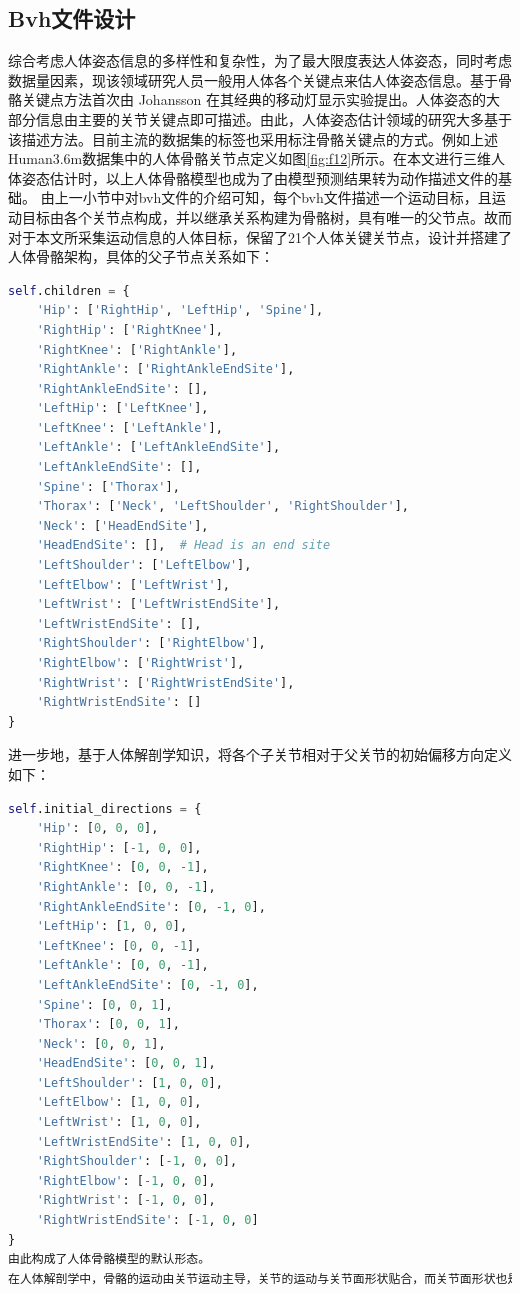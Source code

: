 \subsection{Bvh文件设计}{}
综合考虑人体姿态信息的多样性和复杂性，为了最大限度表达人体姿态，同时考虑数据量因素，现该领域研究人员一般用人体各个关键点来估人体姿态信息。基于骨骼关键点方法首次由  Johansson 在其经典的移动灯显示实验提出。人体姿态的大部分信息由主要的关节关键点即可描述。由此，人体姿态估计领域的研究大多基于该描述方法。目前主流的数据集的标签也采用标注骨骼关键点的方式。例如上述Human3.6m数据集中的人体骨骼关节点定义如图\ref{fig:f12}所示。在本文进行三维人体姿态估计时，以上人体骨骼模型也成为了由模型预测结果转为动作描述文件的基础。
由上一小节中对bvh文件的介绍可知，每个bvh文件描述一个运动目标，且运动目标由各个关节点构成，并以继承关系构建为骨骼树，具有唯一的父节点。故而对于本文所采集运动信息的人体目标，保留了21个人体关键关节点，设计并搭建了人体骨骼架构，具体的父子节点关系如下：

\begin{lstlisting}[language=python, label={lst:children}]
 self.children = {
    'Hip': ['RightHip', 'LeftHip', 'Spine'],
    'RightHip': ['RightKnee'],
    'RightKnee': ['RightAnkle'],
    'RightAnkle': ['RightAnkleEndSite'],
    'RightAnkleEndSite': [],
    'LeftHip': ['LeftKnee'],
    'LeftKnee': ['LeftAnkle'],
    'LeftAnkle': ['LeftAnkleEndSite'],
    'LeftAnkleEndSite': [],
    'Spine': ['Thorax'],
    'Thorax': ['Neck', 'LeftShoulder', 'RightShoulder'],
    'Neck': ['HeadEndSite'],
    'HeadEndSite': [],  # Head is an end site
    'LeftShoulder': ['LeftElbow'],
    'LeftElbow': ['LeftWrist'],
    'LeftWrist': ['LeftWristEndSite'],
    'LeftWristEndSite': [],
    'RightShoulder': ['RightElbow'],
    'RightElbow': ['RightWrist'],
    'RightWrist': ['RightWristEndSite'],
    'RightWristEndSite': []
}
\end{lstlisting}
进一步地，基于人体解剖学知识，将各个子关节相对于父关节的初始偏移方向定义如下：
\begin{lstlisting}[language=python, label={lst:direction}]
self.initial_directions = {
    'Hip': [0, 0, 0],
    'RightHip': [-1, 0, 0],
    'RightKnee': [0, 0, -1],
    'RightAnkle': [0, 0, -1],
    'RightAnkleEndSite': [0, -1, 0],
    'LeftHip': [1, 0, 0],
    'LeftKnee': [0, 0, -1],
    'LeftAnkle': [0, 0, -1],
    'LeftAnkleEndSite': [0, -1, 0],
    'Spine': [0, 0, 1],
    'Thorax': [0, 0, 1],
    'Neck': [0, 0, 1],
    'HeadEndSite': [0, 0, 1],
    'LeftShoulder': [1, 0, 0],
    'LeftElbow': [1, 0, 0],
    'LeftWrist': [1, 0, 0],
    'LeftWristEndSite': [1, 0, 0],
    'RightShoulder': [-1, 0, 0],
    'RightElbow': [-1, 0, 0],
    'RightWrist': [-1, 0, 0],
    'RightWristEndSite': [-1, 0, 0]
}
由此构成了人体骨骼模型的默认形态。
在人体解剖学中，骨骼的运动由关节运动主导，关节的运动与关节面形状贴合，而关节面形状也是在人体的长期活动中，肌肉作用下逐步获得、形成的，以上击力使得人体关节运动一般为绕某个轴进行的旋转运动。在上述简化的人体骨骼模型下，每个骨骼的旋转平面皆可由其他骨骼的方向定义，这为构造bvh文件数据部分的欧拉角任务提供了清晰明确、易于定义的旋转轴。故而针对根节点，即Hip节点保留3个Translation和3个Rotation共6个通道，其余子节点仅保留3个Ratation通道。生成的bvh文件样例附于附录。

\end{lstlisting}
